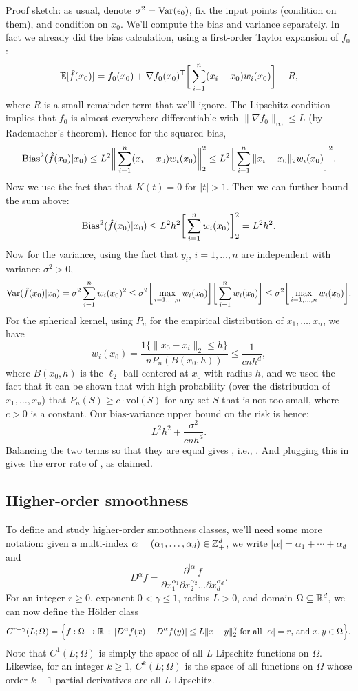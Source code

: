 \documentclass{article}
\begin{document}
Proof sketch: as usual, denote $\sigma^2 = \mathrm{Var}(\epsilon_0)$, fix the input
points (condition on them), and condition on $x_0$. We'll compute the bias and
variance separately. In fact we already did the bias calculation, using a
first-order Taylor expansion of $f_0$: 
\[
\mathbb{E}[\hat{f}(x_0)] = f_0(x_0) + \nabla f_0(x_0)^{\mathsf{T}} \bigg[\sum_{i=1}^n (x_i-x_0)
w_i(x_0) \bigg] + R,  
\]
where $R$ is a small remainder term that we'll ignore. The Lipschitz condition
implies that $f_0$ is almost everywhere differentiable with $\|\nabla
f_0\|_\infty \leq L$ (by Rademacher's theorem). Hence for the squared bias,
\[
\mathrm{Bias}^2(\hat{f}(x_0) | x_0) 
\leq L^2 \bigg\| \sum_{i=1}^n (x_i-x_0) w_i(x_0) \bigg\|_2^2 
\leq L^2 \bigg[ \sum_{i=1}^n \|x_i-x_0\|_2 w_i(x_0) \bigg]^2.
\]
Now we use the fact that that $K(t) = 0$ for $|t| > 1$. Then we can further
bound the sum above: 
\[
\mathrm{Bias}^2(\hat{f}(x_0) | x_0) 
\leq L^2 h^2 \bigg[ \sum_{i=1}^n w_i(x_0) \bigg]_2^2
= L^2 h^2.
\]
Now for the variance, using the fact that $y_i$, $i=1,\dots,n$ are independent
with variance $\sigma^2>0$,
\[
\mathrm{Var}(\hat{f}(x_0) | x_0) 
= \sigma^2 \sum_{i=1}^n w_i(x_0)^2 
\leq \sigma^2 \bigg[ \max_{i=1,\dots,n} w_i(x_0) \bigg] 
\bigg[ \sum_{i=1}^n w_i(x_0) \bigg]  
\leq \sigma^2 \bigg[ \max_{i=1,\dots,n} w_i(x_0) \bigg].
\]
For the spherical kernel, using $P_n$ for the empirical distribution of
$x_1,\dots,x_n$, we have  
\[
w_i(x_0) = \frac{1\{ \|x_0-x_i\|_2 \leq h \}}{n P_n(B(x_0, h)) } \leq
\frac{1}{cnh^d},
\]
where $B(x_0,h)$ is the $\ell_2$ ball centered at $x_0$ with radius $h$, and we
used the fact that it can be shown that with high probability (over the
distribution of $x_1,\dots,x_n$) that $P_n(S) \geq c \cdot \mathrm{vol}(S)$ for
any set $S$ that is not too small, where $c>0$ is a constant. Our bias-variance
upper bound on the risk is hence:
\[
L^2 h^2 + \frac{\sigma^2}{cnh^d}.
\]
Balancing the two terms so that they are equal gives , i.e., . And plugging this in gives
the error rate of , as claimed.   

\subsection{Higher-order smoothness}

To define and study higher-order smoothness classes, we'll need some more
notation: given a multi-index $\alpha=(\alpha_1,\dots,\alpha_d) \in \mathbb{Z}^d_+$, we
write $|\alpha| = \alpha_1 + \cdots + \alpha_d$ and 
\[
D^\alpha f = \frac{\partial^{|\alpha|} f}{\partial x_1^{\alpha_1} \partial
  x_2^{\alpha_2} \dots \partial x_d^{\alpha_d}}.
\]
For an integer $r \geq 0$, exponent $0 < \gamma \leq 1$, radius $L>0$, and
domain $\Omega \subseteq \mathbb{R}^d$, we can now define the H{\"o}lder class  
\[
C^{r+\gamma}(L; \Omega) = \Big\{ f : \Omega \to \mathbb{R} \,:\, | D^\alpha f (x) -
D^\alpha f(y) | \leq L \|x-y\|_2^\gamma \; \text{for all $|\alpha| = r$, and
  $x,y \in \Omega$} \Big\}. 
\]
Note that $C^1(L; \Omega)$ is simply the space of all $L$-Lipschitz functions on
$\Omega$. Likewise, for an integer $k \geq 1$, $C^k(L; \Omega)$ is the space of
all functions on $\Omega$ whose order $k-1$ partial derivatives are all
$L$-Lipschitz. 
\end{document}
